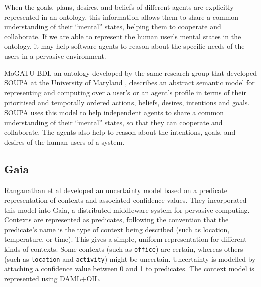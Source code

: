 







When the goals, plans, desires, and beliefs of different agents are explicitly represented in an ontology, this information allows them to share a common understanding of their ``mental'' states, helping them to cooperate and collaborate. If we are able to represent the human user's mental states in the ontology, it may help software agents to reason about the specific needs of the users in a pervasive environment. 

MoGATU \ac{BDI}, an ontology developed by the same research group that developed \ac{SOUPA} at the University of Maryland \cite{Yesha2004}, describes an abstract semantic model for representing and computing over a user's or an agent's profile in terms of their prioritised and temporally ordered actions, beliefs, desires, intentions and goals. \ac{SOUPA} uses this model to help independent agents to share a common understanding of their ``mental'' states, so that they can cooperate and collaborate. The agents also help to reason about the intentions, goals, and desires of the human users of a system. 


\subsection{Gaia}
Ranganathan et al \cite{Ranganathan2004} developed an uncertainty model based on a predicate representation of contexts and associated confidence values. They incorporated this model into Gaia, a distributed middleware system for pervasive computing. Contexts are represented as predicates, following the convention that the predicate's name is the type of context being described (such as location, temperature, or time). This gives a simple, uniform representation for different kinds of contexts. Some contexts (such as \texttt{office}) are certain, whereas others (such as \texttt{location} and \texttt{activity}) might be uncertain. Uncertainty is modelled by attaching a confidence value between 0 and 1 to predicates. The context model is represented using \ac{DAML}+\ac{OIL}.


